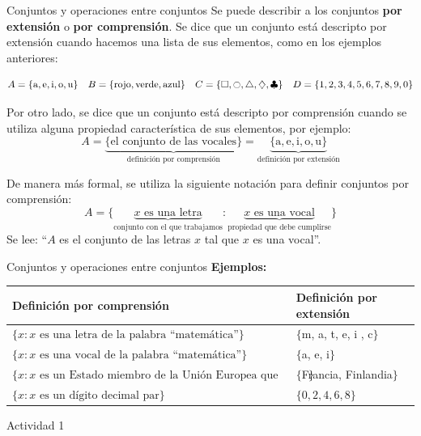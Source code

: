 \documentclass[9pt, aspectratio=169]{beamer}
\begin{document}
\begin{frame}{Conjuntos y operaciones entre conjuntos}
    Se puede describir a los conjuntos \textbf{por extensión} o \textbf{por comprensión}. Se dice que un conjunto está descripto por extensión cuando hacemos una lista de sus elementos, como en los ejemplos anteriores:

\[ A = \{ \text{a}, \text{e}, \text{i}, \text{o}, \text{u} \} \quad B = \{ \text{rojo}, \text{verde}, \text{azul} \} \quad C = \{ \square, \ocircle, \triangle, \diamondsuit, \clubsuit\} \quad  D  = \{1, 2, 3, 4, 5, 6,7 ,8, 9, 0 \}  \] 

Por otro lado, se dice que un conjunto está descripto por comprensión cuando se utiliza alguna propiedad característica de sus elementos, por ejemplo:
\[ A = \underbrace{\{ \text{el conjunto de las vocales} \}}_{\text{definición por comprensión}} = \underbrace{ \{ \text{a}, \text{e}, \text{i}, \text{o}, \text{u} \} }_{\text{definición por extensión}} \]

De manera más formal, se utiliza la siguiente notación para definir conjuntos por comprensión:
\[ A = \{ \underbrace{x \text{ es una letra}}_{\text{conjunto con el que trabajamos}} : \underbrace{x \text{ es una vocal}}_{\text{propiedad que debe cumplirse}} \} \]
Se lee: ``$A$ es el conjunto de las letras $x$ tal que $x$ es una vocal''. 
\end{frame}

\begin{frame}{Conjuntos y operaciones entre conjuntos}
\textbf{Ejemplos:}
    \begin{center}
        \begin{tabular}{p{9.5cm} p{4cm}}
            \toprule
            \textbf{Definición por comprensión} & \textbf{Definición por extensión} \\
            \midrule
            $\{ x : x \text{ es una letra de la palabra ``matemática''} \}$ & $\{$m, a, t, e, i , c$\}$ \\
            $\{ x : x \text{ es una vocal de la palabra ``matemática''}\}$ & $\{$a, e, i$\}$ \\
            $\{ x : x \text{ es un Estado miembro de la Unión Europea que empieza con ``F''}\}$ & $\{$Francia, Finlandia$\}$ \\
            $\{ x : x \text{ es un dígito decimal par}\}$ & $\{0, 2, 4, 6, 8\}$ \\
            \bottomrule
        \end{tabular}
    \end{center}

\vspace{3em}
\begin{center}
{\Large \faArrowCircleRight \faPen* Actividad 1}
\end{center}
\end{frame}
\end{document}
